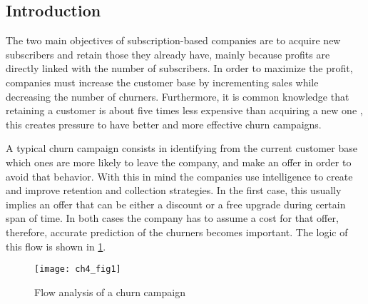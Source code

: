 \subsection{Introduction}
\label{sec:4:1:intro}

The two main objectives of subscription-based companies are to  acquire new subscribers and 
retain those they already have, mainly because profits are directly linked with the number of 
subscribers.  In order to maximize the profit, companies must increase the customer base by 
incrementing sales  while decreasing the number of churners. Furthermore, it is common knowledge 
that retaining a  customer is about five times less expensive than acquiring a new one 
\citep{Farris2010}, this creates  pressure to have better and more effective churn campaigns.

A typical churn campaign consists in identifying from the current customer base which ones are 
more likely to leave the company, and make an offer in order to avoid that behavior.
With this in mind the companies use intelligence to create and improve retention and collection
strategies. In the first case, this usually implies an offer that can be either a discount or a 
free upgrade during certain span of time. In both cases the company has to 	assume a cost for that 
offer, therefore, accurate prediction of the churners becomes important. The logic of this flow is 
shown in \figurename{ \ref{fig:ch4:1}}.

	\begin{figure}[htbp]
	  \centering
    \texttt{[image: ch4\_fig1]}   %
	  \caption{Flow analysis of a churn campaign \citep{Verbraken2012}}
	  \label{fig:ch4:1}
	\end{figure}

